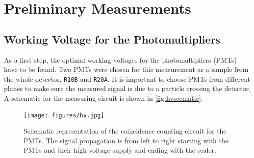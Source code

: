 \chapter{Preliminary Measurements}
\label{sec:prem}
\section{Working Voltage for the Photomultipliers}
As a first step, the optimal working voltages for the photomultipliers (PMTs) have to be found.
Two PMTs were chosen for this measurement as a sample from the whole detector, \texttt{R10B} and \texttt{R20A}.
It is important to choose PMTs from different planes to make sure the measured signal is due to a 
particle crossing the detector. A schematic for the measuring circuit is shown in \autoref{fig:hvscematic}.\\
\begin{figure}
    \centering 
    \texttt{[image: figures/hv.jpg]}
    \caption{Schematic representation of the coincidence counting circuit for the PMTs. 
    The signal propagation is from left to right starting with the PMTs and their high voltage supply and ending with the scaler.}
    \label{fig:hvscematic}
\end{figure}

